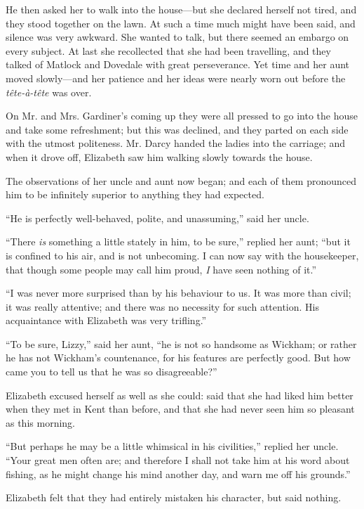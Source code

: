 \documentclass[12pt]{book}
\begin{document}
He then asked her to walk into the house---but she declared herself not tired, and they stood together on the lawn. At such a time much might have been said, and silence was very awkward. She wanted to talk, but there seemed an embargo on every subject. At last she recollected that she had been travelling, and they talked of Matlock and Dovedale with great perseverance. Yet time and her aunt moved slowly---and her patience and her ideas were nearly worn out before the \textit{tête-à-tête} was over.

On Mr. and Mrs. Gardiner's coming up they were all pressed to go into the house and take some refreshment; but this was declined, and they parted on each side with the utmost politeness. Mr. Darcy handed the ladies into the carriage; and when it drove off, Elizabeth saw him walking slowly towards the house.

The observations of her uncle and aunt now began; and each of them pronounced him to be infinitely superior to anything they had expected.

``He is perfectly well-behaved, polite, and unassuming,'' said her uncle.

``There \textit{is} something a little stately in him, to be sure,'' replied her aunt; ``but it is confined to his air, and is not unbecoming. I can now say with the housekeeper, that though some people may call him proud, \textit{I} have seen nothing of it.''

``I was never more surprised than by his behaviour to us. It was more than civil; it was really attentive; and there was no necessity for such attention. His acquaintance with Elizabeth was very trifling.''

``To be sure, Lizzy,'' said her aunt, ``he is not so handsome as Wickham; or rather he has not Wickham's countenance, for his features are perfectly good. But how came you to tell us that he was so disagreeable?''

Elizabeth excused herself as well as she could: said that she had liked him better when they met in Kent than before, and that she had never seen him so pleasant as this morning.

``But perhaps he may be a little whimsical in his civilities,'' replied her uncle. ``Your great men often are; and therefore I shall not take him at his word about fishing, as he might change his mind another day, and warn me off his grounds.''

Elizabeth felt that they had entirely mistaken his character, but said nothing.
\end{document}
